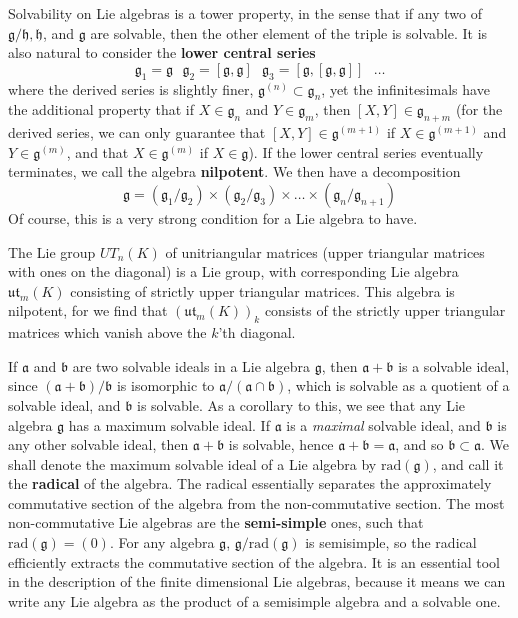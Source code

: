 Solvability on Lie algebras is a tower property, in the sense that if any two of $\mathfrak{g}/\mathfrak{h}, \mathfrak{h}$, and $\mathfrak{g}$ are solvable, then the other element of the triple is solvable. It is also natural to consider the {\bf lower central series}
%
\[ \mathfrak{g}_1 = \mathfrak{g}\ \ \  \mathfrak{g}_2 = [\mathfrak{g}, \mathfrak{g}]\ \ \ \mathfrak{g}_3 = [\mathfrak{g}, [\mathfrak{g}, \mathfrak{g}]]\ \ \  \dots \]
%
where the derived series is slightly finer, $\mathfrak{g}^{(n)} \subset \mathfrak{g}_n$, yet the infinitesimals have the additional property that if $X \in \mathfrak{g}_n$ and $Y \in \mathfrak{g}_m$, then $[X,Y] \in \mathfrak{g}_{n+m}$ (for the derived series, we can only guarantee that $[X,Y] \in \mathfrak{g}^{(m+1)}$ if $X \in \mathfrak{g}^{(m+1)}$ and $Y \in \mathfrak{g}^{(m)}$, and that $X \in \mathfrak{g}^{(m)}$ if $X \in \mathfrak{g}$). If the lower central series eventually terminates, we call the algebra {\bf nilpotent}. We then have a decomposition
%
\[ \mathfrak{g} = (\mathfrak{g}_1/\mathfrak{g}_2) \times (\mathfrak{g}_2/\mathfrak{g}_3) \times \dots \times (\mathfrak{g}_n/\mathfrak{g}_{n+1}) \]
%
Of course, this is a very strong condition for a Lie algebra to have.

\begin{example}
    The Lie group $UT_n(K)$ of unitriangular matrices (upper triangular matrices with ones on the diagonal) is a Lie group, with corresponding Lie algebra $\mathfrak{ut}_m(K)$ consisting of strictly upper triangular matrices. This algebra is nilpotent, for we find that $(\mathfrak{ut}_m(K))_k$ consists of the strictly upper triangular matrices which vanish  above the $k$'th diagonal.
\end{example}

If $\mathfrak{a}$ and $\mathfrak{b}$ are two solvable ideals in a Lie algebra $\mathfrak{g}$, then $\mathfrak{a} + \mathfrak{b}$ is a solvable ideal, since $(\mathfrak{a} + \mathfrak{b})/\mathfrak{b}$ is isomorphic to $\mathfrak{a}/(\mathfrak{a} \cap \mathfrak{b})$, which is solvable as a quotient of a solvable ideal, and $\mathfrak{b}$ is solvable. As a corollary to this, we see that any Lie algebra $\mathfrak{g}$ has a maximum solvable ideal. If $\mathfrak{a}$ is a {\it maximal} solvable ideal, and $\mathfrak{b}$ is any other solvable ideal, then $\mathfrak{a} + \mathfrak{b}$ is solvable, hence $\mathfrak{a} + \mathfrak{b} = \mathfrak{a}$, and so $\mathfrak{b} \subset \mathfrak{a}$. We shall denote the maximum solvable ideal of a Lie algebra by $\text{rad}(\mathfrak{g})$, and call it the {\bf radical} of the algebra. The radical essentially separates the approximately commutative section of the algebra from the non-commutative section. The most non-commutative Lie algebras are the {\bf semi-simple} ones, such that $\text{rad}(\mathfrak{g}) = (0)$. For any algebra $\mathfrak{g}$, $\mathfrak{g}/\text{rad}(\mathfrak{g})$ is semisimple, so the radical efficiently extracts the commutative section of the algebra. It is an essential tool in the description of the finite dimensional Lie algebras, because it means we can write any Lie algebra as the product of a semisimple algebra and a solvable one.

